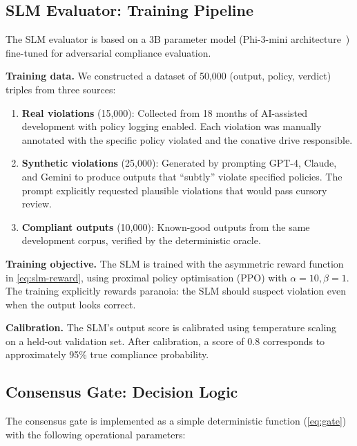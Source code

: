 \documentclass[11pt,a4paper]{article}
\begin{document}
\subsection{SLM Evaluator: Training Pipeline}

The SLM evaluator is based on a 3B parameter model (Phi-3-mini
architecture~\citep{abdin2024phi}) fine-tuned for adversarial
compliance evaluation.

\textbf{Training data.}  We constructed a dataset of 50,000
(output, policy, verdict) triples from three sources:

\begin{enumerate}
  \item \textbf{Real violations} (15,000): Collected from 18 months
        of AI-assisted development with policy logging enabled.
        Each violation was manually annotated with the specific
        policy violated and the conative drive responsible.
  \item \textbf{Synthetic violations} (25,000): Generated by
        prompting GPT-4, Claude, and Gemini to produce outputs that
        ``subtly'' violate specified policies.  The prompt
        explicitly requested plausible violations that would pass
        cursory review.
  \item \textbf{Compliant outputs} (10,000): Known-good outputs
        from the same development corpus, verified by the
        deterministic oracle.
\end{enumerate}

\textbf{Training objective.}  The SLM is trained with the asymmetric
reward function in \cref{eq:slm-reward}, using proximal policy
optimisation (PPO) with $\alpha = 10, \beta = 1$.  The training
explicitly rewards paranoia: the SLM should suspect violation even
when the output looks correct.

\textbf{Calibration.}  The SLM's output score is calibrated using
temperature scaling~\citep{guo2017calibration} on a held-out
validation set.  After calibration, a score of 0.8 corresponds to
approximately 95\% true compliance probability.

\subsection{Consensus Gate: Decision Logic}

The consensus gate is implemented as a simple deterministic function
(\cref{eq:gate}) with the following operational parameters:
\end{document}
